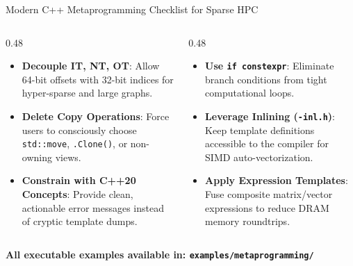 \documentclass[aspectratio=169,10pt]{beamer}
\newcommand{\metricbox}[1]{%
  \par\vspace{0.25em}%
  \centering%
  \colorbox{AccentWash}{\parbox{0.94\linewidth}{\centering\strut\textcolor{Ink}{\bfseries #1}}}%
  \par\vspace{0.10em}%
}
\newcommand{\subhead}[1]{%
  \medskip{\large\bfseries\textcolor{Accent}{#1}\par}%
  \vspace{-0.18cm}{\color{Accent}\rule{0.88\linewidth}{1.2pt}\par}\smallskip}
\begin{document}
\begin{frame}{Modern C++ Metaprogramming Checklist for Sparse HPC}
  \begin{columns}[T,onlytextwidth]
    \begin{column}{0.48\textwidth}
      \subhead{Rules to Follow}
      \begin{itemize}\setlength{\itemsep}{0.5em}
        \item[\checkmark] \textbf{Decouple IT, NT, OT}: Allow 64-bit offsets with 32-bit indices for hyper-sparse and large graphs.
        \item[\checkmark] \textbf{Delete Copy Operations}: Force users to consciously choose \texttt{std::move}, \texttt{.Clone()}, or non-owning views.
        \item[\checkmark] \textbf{Constrain with C++20 Concepts}: Provide clean, actionable error messages instead of cryptic template dumps.
      \end{itemize}
    \end{column}
    \begin{column}{0.48\textwidth}
      \subhead{Performance Maximizers}
      \begin{itemize}\setlength{\itemsep}{0.5em}
        \item[\checkmark] \textbf{Use \texttt{if constexpr}}: Eliminate branch conditions from tight computational loops.
        \item[\checkmark] \textbf{Leverage Inlining (\texttt{-inl.h})}: Keep template definitions accessible to the compiler for SIMD auto-vectorization.
        \item[\checkmark] \textbf{Apply Expression Templates}: Fuse composite matrix/vector expressions to reduce DRAM memory roundtrips.
      \end{itemize}
    \end{column}
  \end{columns}
  \vfill
  \metricbox{All executable examples available in: \texttt{examples/metaprogramming/}}
\end{frame}
\end{document}
